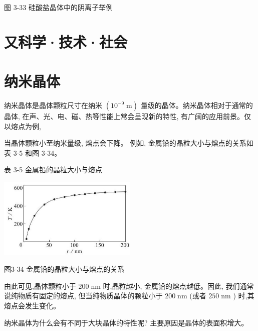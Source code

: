 \documentclass[10pt]{article}
\begin{document}
图 3-33 硅酸盐晶体中的阴离子举例

\section*{又科学·技术·社会}

\section*{纳米晶体}

纳米晶体是晶体颗粒尺寸在纳米 \(\left( {{10}^{-9}\mathrm{\;m}}\right)\) 量级的晶体。纳米晶体相对于通常的晶体, 在声、光、电、磁、热等性能上常会呈现新的特性, 有广阔的应用前景。仅以熔点为例,

当晶体颗粒小至纳米量级, 熔点会下降。 例如, 金属铅的晶粒大小与熔点的关系如表 3-5 和图 3-34。

表 3-5 金属铅的晶粒大小与熔点

\begin{center}
\end{center}

\begin{center}
\includegraphics[max width=0.5\textwidth]{images/0190e026-5a11-7df7-bd27-54d09026ba7a_95_203128.jpg}
\end{center}

图3-34 金属铅的晶粒大小与熔点的关系

由此可见,晶体颗粒小于 \({200}\mathrm{\;{nm}}\) 时,晶粒越小, 金属铅的熔点越低。因此, 我们通常说纯物质有固定的熔点, 但当纯物质晶体的颗粒小于 \({200}\mathrm{\;{nm}}\) (或者 \({250}\mathrm{\;{nm}}\) ) 时,其熔点会发生变化。

纳米晶体为什么会有不同于大块晶体的特性呢? 主要原因是晶体的表面积增大。
\end{document}
